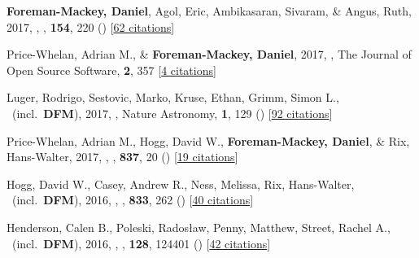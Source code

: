 \item[{\color{numcolor}\scriptsize28}] \textbf{Foreman-Mackey, Daniel}, Agol, Eric, Ambikasaran, Sivaram, \& Angus, Ruth, 2017, , \aj, \textbf{154}, 220 () [\href{http://adsabs.harvard.edu/abs/2017AJ....154..220F}{62 citations}]

\item[{\color{numcolor}\scriptsize27}] Price-Whelan, Adrian M., \& \textbf{Foreman-Mackey, Daniel}, 2017, , The Journal of Open Source Software, \textbf{2}, 357 [\href{http://adsabs.harvard.edu/abs/2017JOSS....2..357P}{4 citations}]

\item[{\color{numcolor}\scriptsize26}] Luger, Rodrigo, Sestovic, Marko, Kruse, Ethan, Grimm, Simon L., \etal\ (incl.\ \textbf{DFM}), 2017, , Nature Astronomy, \textbf{1}, 129 () [\href{http://adsabs.harvard.edu/abs/2017NatAs...1E.129L}{92 citations}]

\item[{\color{numcolor}\scriptsize25}] Price-Whelan, Adrian M., Hogg, David W., \textbf{Foreman-Mackey, Daniel}, \& Rix, Hans-Walter, 2017, , \apj, \textbf{837}, 20 () [\href{http://adsabs.harvard.edu/abs/2017ApJ...837...20P}{19 citations}]

\item[{\color{numcolor}\scriptsize24}] Hogg, David W., Casey, Andrew R., Ness, Melissa, Rix, Hans-Walter, \etal\ (incl.\ \textbf{DFM}), 2016, , \apj, \textbf{833}, 262 () [\href{http://adsabs.harvard.edu/abs/2016ApJ...833..262H}{40 citations}]

\item[{\color{numcolor}\scriptsize23}] Henderson, Calen B., Poleski, Rados{\l}aw, Penny, Matthew, Street, Rachel A., \etal\ (incl.\ \textbf{DFM}), 2016, , \pasp, \textbf{128}, 124401 () [\href{http://adsabs.harvard.edu/abs/2016PASP..128l4401H}{42 citations}]


